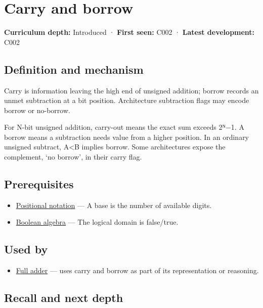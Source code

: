 \hypertarget{appendix-d52d5f78ffd1}{}
\section{Carry and borrow}\label{appendix-d52d5f78ffd1-carry-and-borrow}

\textbf{Curriculum depth:} Introduced · \textbf{First seen:} C002 · \textbf{Latest development:} C002

\subsection{Definition and mechanism}\label{appendix-d52d5f78ffd1-definition-and-mechanism}

Carry is information leaving the high end of unsigned addition; borrow records an unmet subtraction at a bit position. Architecture subtraction flags may encode borrow or no-borrow.

For N-bit unsigned addition, carry-out means the exact sum exceeds 2ᴺ−1. A borrow means a subtraction needs value from a higher position. In an ordinary unsigned subtract, A\textless B implies borrow. Some architectures expose the complement, `no borrow', in their carry flag.

\subsection{Prerequisites}\label{appendix-d52d5f78ffd1-prerequisites}

\begin{itemize}
\tightlist
\item
  \hyperref[appendix-83c3f28f7bda]{Positional notation} --- A base is the number of available digits.
\item
  \hyperref[appendix-24475e1596a8]{Boolean algebra} --- The logical domain is false/true.
\end{itemize}

\subsection{Used by}\label{appendix-d52d5f78ffd1-used-by}

\begin{itemize}
\tightlist
\item
  \hyperref[appendix-d1a5b1e520c2]{Full adder} --- uses carry and borrow as part of its representation or reasoning.
\end{itemize}

\subsection{Recall and next depth}\label{appendix-d52d5f78ffd1-recall-and-next-depth}

